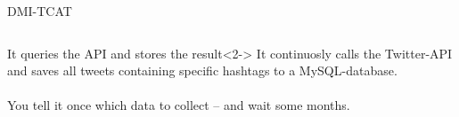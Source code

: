 \documentclass{beamer}
\begin{document}
\begin{frame}[t]{DMI-TCAT}
\begin{columns}
\begin{block}{It queries the API and stores the result}<2->
It continuosly calls the Twitter-API and saves all tweets containing specific hashtags to a MySQL-database.
\\~\\
You tell it once which data to collect -- and wait some months.
\end{block}
\end{columns}
\end{frame}
\end{document}
